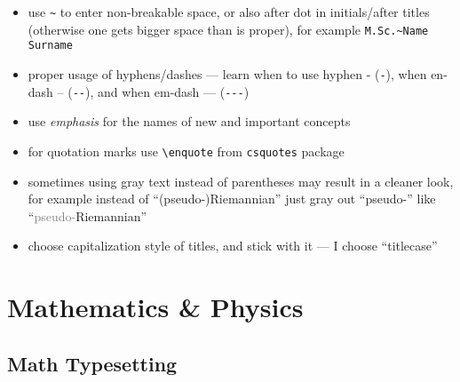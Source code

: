 \begin{itemize}
    \item use \verb|~| to enter non-breakable space, or also after dot in initials/after titles
          (otherwise one gets bigger space than is proper), for example \verb|M.Sc.~Name Surname|
    \item proper usage of hyphens/dashes --- learn when to use hyphen - (\verb|-|), when en-dash -- (\verb|--|), and when em-dash --- (\verb|---|)
    \item use \emph{emphasis} for the names of new and important concepts
    \item for quotation marks use \verb|\enquote| from \texttt{csquotes} package
    \item sometimes using gray text instead of parentheses may result in a cleaner look, for example instead of \enquote{(pseudo-)Riemannian} just gray out \enquote{pseudo-} like \enquote{\textcolor{gray}{pseudo-}Riemannian}
    \item choose capitalization style of titles, and stick with it --- I choose \enquote{titlecase}
\end{itemize}


\section{Mathematics \& Physics}%
\label{sec:MathematicsandPhysics}

\subsection{Math Typesetting}%
\label{sub:Math Typesetting}

